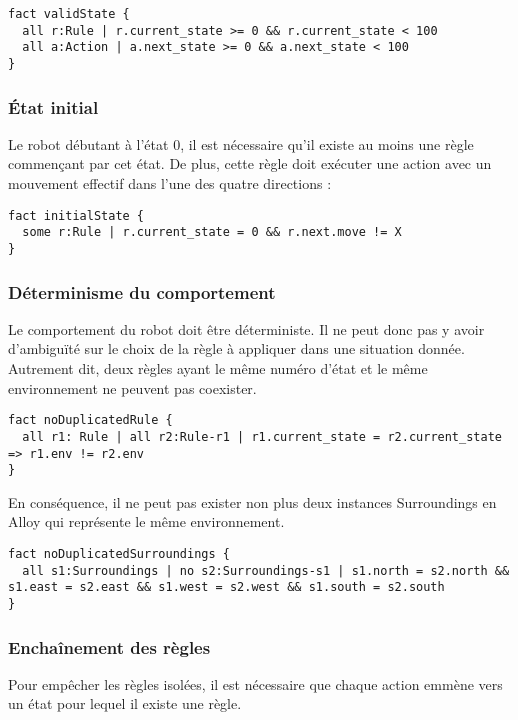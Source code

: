 \documentclass{article}
\begin{document}
\begin{lstlisting}
fact validState {
  all r:Rule | r.current_state >= 0 && r.current_state < 100
  all a:Action | a.next_state >= 0 && a.next_state < 100
}
\end{lstlisting}

\subsubsection*{État initial}
Le robot débutant à l’état 0, il est nécessaire qu'il existe au moins une règle commençant par cet état. De plus, cette règle doit exécuter une action avec un mouvement effectif dans l'une des quatre directions :

\begin{lstlisting}
fact initialState {
  some r:Rule | r.current_state = 0 && r.next.move != X
}
\end{lstlisting}

\subsubsection*{Déterminisme du comportement}

Le comportement du robot doit être déterministe. Il ne peut donc pas y avoir d'ambiguïté sur le choix de la règle à appliquer dans une situation donnée. Autrement dit, deux règles ayant le même numéro d'état et le même environnement ne peuvent pas coexister. 

\begin{lstlisting}
fact noDuplicatedRule {
  all r1: Rule | all r2:Rule-r1 | r1.current_state = r2.current_state => r1.env != r2.env 
}
\end{lstlisting}

En conséquence, il ne peut pas exister non plus deux instances Surroundings en Alloy qui représente le même environnement.

\begin{lstlisting}
fact noDuplicatedSurroundings {
  all s1:Surroundings | no s2:Surroundings-s1 | s1.north = s2.north && s1.east = s2.east && s1.west = s2.west && s1.south = s2.south  
}
\end{lstlisting}

\subsubsection*{Enchaînement des règles}
Pour empêcher les règles isolées, il est nécessaire que chaque action emmène vers un état pour lequel il existe une règle.
\end{document}
